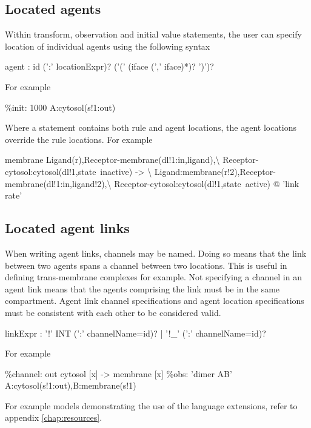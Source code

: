 \subsection{Located agents}

Within transform, observation and initial value statements, the user can specify location of individual agents using the following syntax
\begin{bnfsource}
agent :
  id (':' locationExpr)? ('(' (iface (',' iface)*)? ')')?
\end{bnfsource}
For example
\begin{kappasource}
\%init: 1000 A:cytosol(s!1:out)
\end{kappasource}

Where a statement contains both rule and agent locations, the agent locations override the rule locations. For example
\begin{kappasource}
membrane Ligand(r),Receptor-membrane(dl!1:in,ligand),{\textbackslash}
    Receptor-cytosol:cytosol(dl!1,state~inactive) -> {\textbackslash}
    Ligand:membrane(r!2),Receptor-membrane(dl!1:in,ligand!2),{\textbackslash}
    Receptor-cytosol:cytosol(dl!1,state~active) @ 'link rate'
\end{kappasource}

\subsection{Located agent links}

When writing agent links, channels may be named. Doing so means that the link between two agents spans a channel between two locations. This is useful in defining trans-membrane complexes for example. Not specifying a channel in an agent link means that the agents comprising the link must be in the same compartment. Agent link channel specifications and agent location specifications must be consistent with each other to be considered valid.

\begin{bnfsource}
linkExpr :
  '!' INT (':' channelName=id)?
  | '!_' (':' channelName=id)?
\end{bnfsource}
For example
\begin{kappasource}
\%channel: out cytosol [x] -> membrane [x]
\%obs: 'dimer AB' A:cytosol(s!1:out),B:membrane(s!1) 
\end{kappasource}


\bigskip For example models demonstrating the use of the language extensions, refer to appendix \ref{chap:resources}.

\newpage
